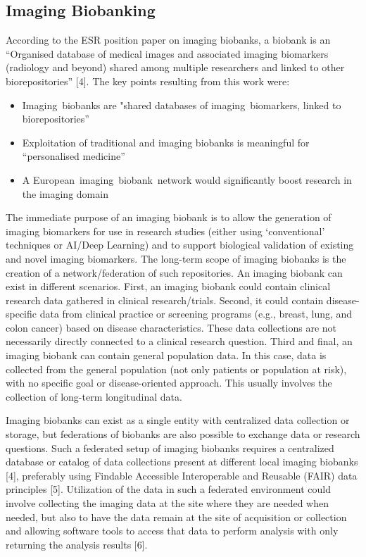 \subsection{Imaging Biobanking}
According to the ESR position paper on imaging biobanks, a biobank is an “Organised database of medical images and associated imaging biomarkers (radiology and beyond) shared among multiple researchers and linked to other biorepositories” [4]. The key points resulting from this work were:
\begin{itemize}
 \item Imaging biobanks are "shared databases of imaging biomarkers, linked to biorepositories”
    \item Exploitation of traditional and imaging biobanks is meaningful for “personalised medicine”
    \item A European imaging biobank network would significantly boost research in the imaging domain
\end{itemize}
   
The immediate purpose of an imaging biobank is to allow the generation of imaging biomarkers for use in research studies (either using ‘conventional’ techniques or AI/Deep Learning) and to support biological validation of existing and novel imaging biomarkers. The long-term scope of imaging biobanks is the creation of a network/federation of such repositories.
An imaging biobank can exist in different scenarios. First, an imaging biobank could contain clinical research data gathered in clinical research/trials. Second, it could contain disease-specific data from clinical practice or screening programs (e.g., breast, lung, and colon cancer) based on disease characteristics. These data collections are not necessarily directly connected to a clinical research question. Third and final, an imaging biobank can contain general population data. In this case, data is collected from the general population (not only patients or population at risk), with no specific goal or disease-oriented approach. This usually involves the collection of long-term longitudinal data.


Imaging biobanks can exist as a single entity with centralized data collection or storage, but federations of biobanks are also possible to exchange data or research questions. Such a federated setup of imaging biobanks requires a centralized database or catalog of data collections present at different local imaging biobanks [4], preferably using Findable Accessible Interoperable and Reusable (FAIR) data principles [5]. Utilization of the data in such a federated environment could involve collecting the imaging data at the site where they are needed when needed, but also to have the data remain at the site of acquisition or collection and allowing software tools to access that data to perform analysis with only returning the analysis results [6]. 


